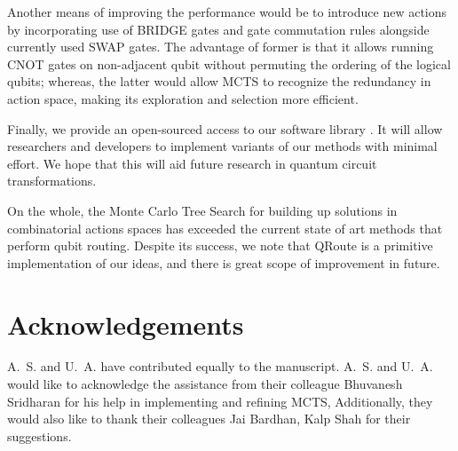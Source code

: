 \documentclass[%
 reprint,
amsmath,amssymb,
pra,
]{revtex4-2}
\begin{document}
Another means of improving the performance  would be to introduce new actions by incorporating use of BRIDGE gates \citep{bridge_gate} and gate commutation rules \citep{utk_equiv_circuits} alongside currently used SWAP gates. The advantage of former is that it allows running CNOT gates on non-adjacent qubit without permuting the ordering of the logical qubits; whereas, the latter would allow MCTS to recognize the redundancy in action space, making its exploration and selection more efficient.

Finally, we provide an open-sourced access to our software library \citep{codebase}. It will allow researchers and developers to implement variants of our methods with minimal effort. We hope that this will aid future research in quantum circuit transformations.

On the whole, the Monte Carlo Tree Search for building up solutions in combinatorial actions spaces has exceeded the current state of art methods that perform qubit routing. Despite its success, we note that QRoute is a primitive implementation of our ideas, and there is great scope of improvement in future. 

\section*{Acknowledgements}
A.~S. and U.~A. have contributed equally to the manuscript. A.~S. and U.~A. would like to acknowledge the assistance from their colleague Bhuvanesh Sridharan for his help in implementing and refining MCTS, Additionally, they would also like to thank their colleagues Jai Bardhan, Kalp Shah for their suggestions.



\end{document}
